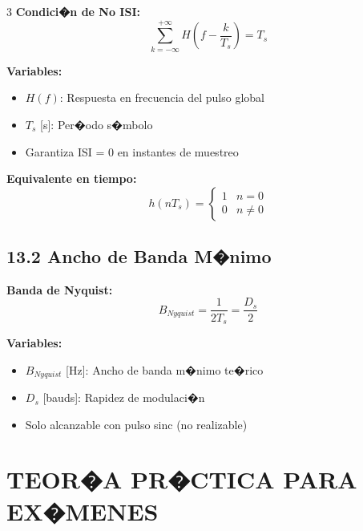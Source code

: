 ﻿\documentclass[8pt,a4paper]{article}
\begin{document}
\begin{multicols}{3}
\textbf{Condici�n de No ISI:}
\[
\sum_{k=-\infty}^{+\infty} H\left(f - \frac{k}{T_s}\right) = T_s
\]

\textbf{Variables:}
\begin{itemize}[leftmargin=*,itemsep=0pt]
    \item $H(f)$: Respuesta en frecuencia del pulso global
    \item $T_s$ [s]: Per�odo s�mbolo
    \item Garantiza ISI = 0 en instantes de muestreo
\end{itemize}

\textbf{Equivalente en tiempo:}
\[
h(nT_s) = \begin{cases}
1 & n = 0 \\
0 & n \neq 0
\end{cases}
\]

\vspace{-2mm}
\subsection*{\small 13.2 Ancho de Banda M�nimo}
\vspace{-2mm}

\textbf{Banda de Nyquist:}
\[
B_{Nyquist} = \frac{1}{2T_s} = \frac{D_s}{2}
\]

\textbf{Variables:}
\begin{itemize}[leftmargin=*,itemsep=0pt]
    \item $B_{Nyquist}$ [Hz]: Ancho de banda m�nimo te�rico
    \item $D_s$ [bauds]: Rapidez de modulaci�n
    \item Solo alcanzable con pulso sinc (no realizable)
\end{itemize}

\end{multicols}

\newpage

\section*{\color{sectioncolor}\Large TEOR�A PR�CTICA PARA EX�MENES}
\vspace{-3mm}
\end{document}
